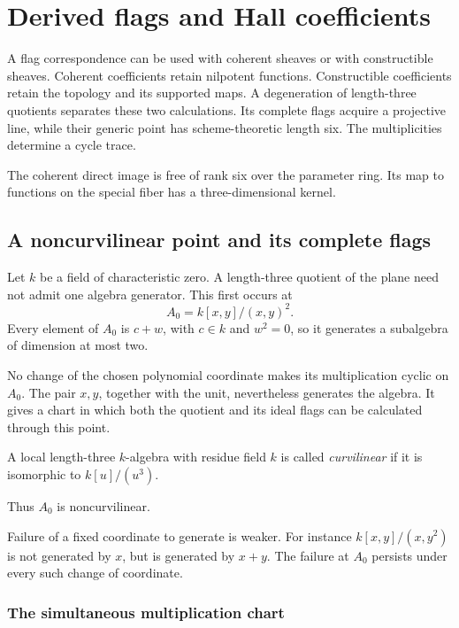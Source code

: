 \chapter{Derived flags and Hall coefficients}
\label{cyf:chapter}

A flag correspondence can be used with coherent sheaves or
with constructible sheaves. Coherent coefficients retain
nilpotent functions. Constructible coefficients retain the
topology and its supported maps. A degeneration of length-three
quotients separates these two calculations. Its complete flags
acquire a projective line, while their generic point has
scheme-theoretic length six. The multiplicities determine a
cycle trace.

The coherent direct image is free of rank six
over the parameter ring. Its map to functions on the special
fiber has a three-dimensional kernel.

\section{A noncurvilinear point and its complete flags}
\label{cyf:section}

Let \(k\) be a field of characteristic zero. A length-three
quotient of the plane need not admit one algebra generator.
This first occurs at
\[
                       A_0=k[x,y]/(x,y)^2.
\]
Every element of \(A_0\) is \(c+w\), with \(c\in k\) and
\(w^2=0\), so it generates a subalgebra
of dimension at most two.

No change of the chosen polynomial
coordinate makes its multiplication cyclic on \(A_0\).
The pair \(x,y\), together with the unit, nevertheless
generates the algebra. It gives a chart in which both the
quotient and its ideal flags can be calculated through this
point.

\begin{definition}
A local length-three \(k\)-algebra with residue field \(k\)
is called \emph{curvilinear} if it is isomorphic to
\(k[u]/(u^3)\).
\end{definition}
Thus \(A_0\) is noncurvilinear.

Failure of a fixed coordinate to generate is weaker.
For instance \(k[x,y]/(x,y^2)\) is not generated by \(x\),
but is generated by \(x+y\). The failure at \(A_0\)
persists under every such change of coordinate.

\subsection{The simultaneous multiplication chart}


